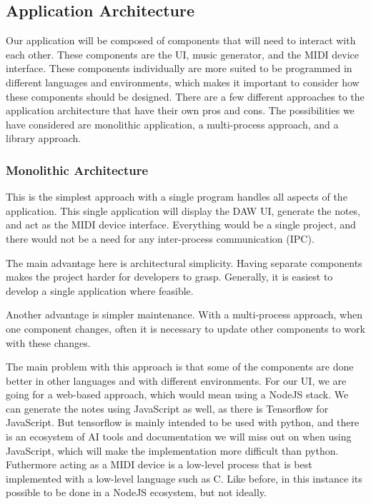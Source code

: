\subsection{Application Architecture}
\label{sec:app_architecture}

Our application will be composed of components that will need to interact with each other.
These components are the UI, music generator, and the MIDI device interface. These
components individually are more suited to be programmed in different languages and
environments, which makes it important to consider how these components should be
designed. There are a few different approaches to the application architecture that have
their own pros and cons. The possibilities we have considered are monolithic application,
a multi-process approach, and a library approach.

\subsubsection{Monolithic Architecture}

This is the simplest approach with a single program handles all aspects of the
application. This single application will display the DAW UI, generate the notes, and act
as the MIDI device interface. Everything would be a single project, and there would not be
a need for any inter-process communication (IPC).

The main advantage here is architectural simplicity. Having separate components makes the
project harder for developers to grasp. Generally, it is easiest to develop a single
application where feasible.

Another advantage is simpler maintenance. With a multi-process approach, when one
component changes, often it is necessary to update other components to work with these
changes.

The main problem with this approach is that some of the components are done better in
other languages and with different environments. For our UI, we are going for a web-based
approach, which would mean using a NodeJS stack. We can generate the notes using
JavaScript as well, as there is Tensorflow for JavaScript. But tensorflow is mainly
intended to be used with python, and there is an ecosystem of AI tools and documentation
we will miss out on when using JavaScript, which will make the implementation more
difficult than python. Futhermore acting as a MIDI device is a low-level process that is
best implemented with a low-level language such as C. Like before, in this instance its
possible to be done in a NodeJS ecosystem, but not ideally.

